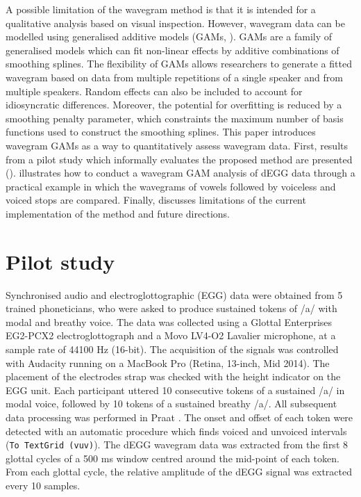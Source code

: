 \documentclass[
  11pt,
  a4paper,
]{article}
\begin{document}
A possible limitation of the wavegram method is that it is intended for
a qualitative analysis based on visual inspection. However, wavegram
data can be modelled using generalised additive models (GAMs,
\citealt{hastie1986, zuur2012, wood2017}). GAMs are a family of
generalised models which can fit non-linear effects by additive
combinations of smoothing splines. The flexibility of GAMs allows
researchers to generate a fitted wavegram based on data from multiple
repetitions of a single speaker and from multiple speakers. Random
effects can also be included to account for idiosyncratic differences.
Moreover, the potential for overfitting is reduced by a smoothing
penalty parameter, which constraints the maximum number of basis
functions used to construct the smoothing splines. This paper introduces
wavegram GAMs as a way to quantitatively assess wavegram data. First,
results from a pilot study which informally evaluates the proposed
method are presented ().  illustrates how
to conduct a wavegram GAM analysis of dEGG data through a practical
example in which the wavegrams of vowels followed by voiceless and
voiced stops are compared. Finally,  discusses
limitations of the current implementation of the method and future
directions.

\hypertarget{pilot-study}{%
\section{Pilot study}\label{pilot-study}}

\label{s:pilot}

Synchronised audio and electroglottographic (EGG) data were obtained
from 5 trained phoneticians, who were asked to produce sustained tokens
of /a/ with modal and breathy voice. The data was collected using a
Glottal Enterprises EG2-PCX2 electroglottograph and a Movo LV4-O2
Lavalier microphone, at a sample rate of 44100 Hz (16-bit). The
acquisition of the signals was controlled with Audacity running on a
MacBook Pro (Retina, 13-inch, Mid 2014). The placement of the electrodes
strap was checked with the height indicator on the EGG unit. Each
participant uttered 10 consecutive tokens of a sustained /a/ in modal
voice, followed by 10 tokens of a sustained breathy /a/. All subsequent
data processing was performed in Praat \citep{boersma2018}. The onset
and offset of each token were detected with an automatic procedure which
finds voiced and unvoiced intervals (\texttt{To\ TextGrid\ (vuv)}). The
dEGG wavegram data was extracted from the first 8 glottal cycles of a
500 ms window centred around the mid-point of each token. From each
glottal cycle, the relative amplitude of the dEGG signal was extracted
every 10 samples.
\end{document}
